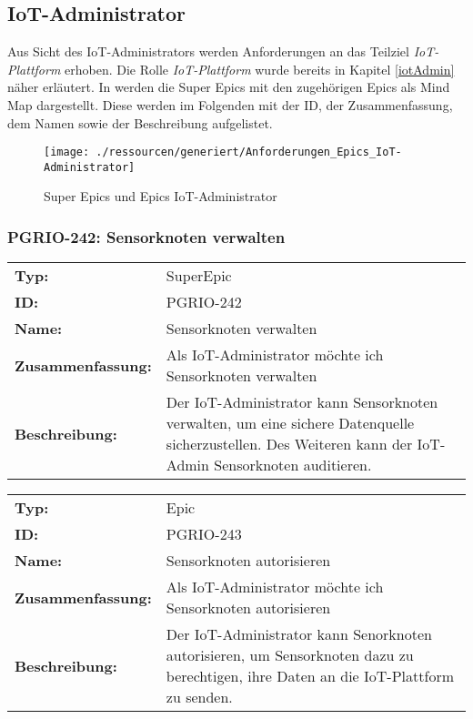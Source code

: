 \subsection{IoT-Administrator}
Aus Sicht des IoT-Administrators werden Anforderungen an das Teilziel \textit{IoT-Plattform} erhoben. Die Rolle \textit{IoT-Plattform} wurde bereits in Kapitel \ref{iotAdmin} näher erläutert. In  werden die Super Epics mit den zugehörigen Epics als Mind Map dargestellt. Diese werden im Folgenden mit der ID, der Zusammenfassung, dem Namen sowie der Beschreibung aufgelistet.

\begin{figure}[H]
	\centering
	\texttt{[image: ./ressourcen/generiert/Anforderungen\_Epics\_IoT-Administrator]}
	\caption{Super Epics und Epics IoT-Administrator}
	\label{fig:IoTAdminEpics}
\end{figure}

\subsubsection{PGRIO-242: Sensorknoten verwalten} 
\begin{flushleft} 
\begin{tabular}{@{}lp{100mm}} 
\textbf{Typ:} & SuperEpic \\ 
\textbf{ID:} & PGRIO-242 \\ 
\textbf{Name:} & Sensorknoten verwalten \\ 
\textbf{Zusammenfassung:} & Als IoT-Administrator möchte ich Sensorknoten verwalten \\ 
\textbf{Beschreibung:} & Der IoT-Administrator kann Sensorknoten verwalten, um eine sichere Datenquelle sicherzustellen. Des Weiteren kann der IoT-Admin Sensorknoten auditieren. \\ 
\end{tabular} 
\end{flushleft} 

		\begin{flushleft} 
\begin{tabular}{@{}lp{100mm}} 
\textbf{Typ:} & Epic \\ 
\textbf{ID:} & PGRIO-243 \\ 
\textbf{Name:} & Sensorknoten autorisieren \\ 
\textbf{Zusammenfassung:} & Als IoT-Administrator möchte ich Sensorknoten autorisieren \\ 
\textbf{Beschreibung:} & Der IoT-Administrator kann Senorknoten autorisieren, um Sensorknoten dazu zu berechtigen, ihre Daten an die IoT-Plattform zu senden. \\ 
\end{tabular} 
\end{flushleft} 

